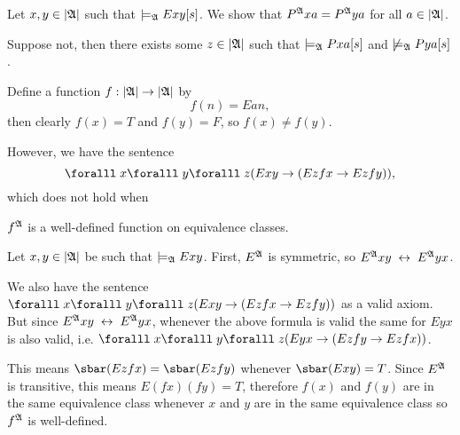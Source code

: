 \begin{Answer}
\begin{enumalph}
      \step
      Let $x, y \in \lvert\mathfrak{A}\rvert$ such that $\models_{\mathfrak{A}} E xy[s]$.
      We show that $P^{\mathfrak{A}} xa = P^{\mathfrak{A}} ya$ for all $a \in \lvert\mathfrak{A}\rvert$.

      \step
      Suppose not, then there exists some $z \in \lvert\mathfrak{A}\rvert$ such that
      $\models_{\mathfrak{A}} P xa[s]$ and $\not \models_{\mathfrak{A}} P ya[s]$.

      \step
      Define a function $f : \lvert\mathfrak{A}\rvert \to \lvert\mathfrak{A}\rvert$ by
      \[ f(n) = E a n, \]
      then clearly $f(x) = T$ and $f(y) = F$, so $f(x) \ne f(y)$.

      \step
      However, we have the sentence
      \[ \forall x \forall y \forall z (Exy \lto (Ez fx \lto Ez fy)), \]
      which does not hold when
    \item $f^{\mathfrak{A}}$ is a well-defined function on equivalence classes.
      
      \step
      Let $x, y \in \lvert\mathfrak{A}\rvert$ be such that $\models_{\mathfrak{A}} Exy$.
      First, $E^{\mathfrak{A}}$ is symmetric, so $E^{\mathfrak{A}} xy \;\leftrightarrow\; E^{\mathfrak{A}} yx$.

      \step
      We also have the sentence
      $\forall x \forall y \forall z (Exy \lto (Ez fx \lto Ez fy))$
      as a valid axiom.
      But since $E^{\mathfrak{A}} xy \;\leftrightarrow\; E^{\mathfrak{A}} yx$,
      whenever the above formula is valid the same for $Eyx$ is also valid,
      i.e. $\forall x \forall y \forall z (Eyx \lto (Ez fy \lto Ez fx))$.

      \step
      This means $\sbar(E z fx) = \sbar(E z fy)$ whenever $\sbar(E x y) = T$.
      Since $E^{\mathfrak{A}}$ is transitive, this means $E (fx) (fy) = T$,
      therefore $f(x)$ and $f(y)$ are in the same equivalence class
      whenever $x$ and $y$ are in the same equivalence class
      so $f^{\mathfrak{A}}$ is well-defined.
  \end{enumalph}
\end{Answer}
